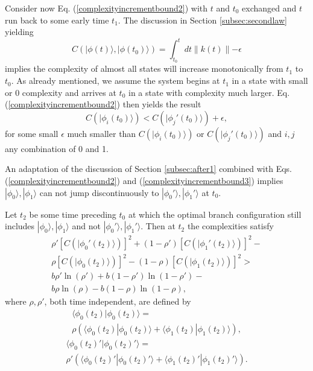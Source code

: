 \documentclass[twocolumn,amsmath,amssymb]{revtex4-1}
\begin{document}
Consider now Eq. (\ref{complexityincrementbound2}) with
$t$ and $t_0$ exchanged and $t$ run back to some early time
$t_1$.  The
discussion in Section \ref{subsec:secondlaw}
yielding
\begin{equation}
  \label{complexityincrement2x}
  C( |\phi(t) \rangle , |\phi(t_0) \rangle ) = \int_{t_0}^t dt \parallel k(t) \parallel - \epsilon
\end{equation}
implies the complexity of almost all states will
increase monotonically from $t_1$ to $t_0$.
As already mentioned, we assume the system
begins at $t_1$ in a state with small or 0 complexity
and arrives at $t_0$ in a state with complexity
much larger.  Eq. (\ref{complexityincrementbound2})
then yields the result
\begin{equation}
  \label{complexityincrementbound3}
  C(|\phi_i(t_0) \rangle ) < C(|\phi_j'(t_0) \rangle ) + \epsilon,
\end{equation}
for some small $\epsilon$ much smaller than
$C(|\phi_i(t_0) \rangle )$ or $C(|\phi_j'(t_0) \rangle )$
and $i, j$  any combination of 0 and 1.

An adaptation of the discussion of
Section \ref{subsec:after1} combined with
Eqs. (\ref{complexityincrementbound2}) and
(\ref{complexityincrementbound3})
implies $|\phi_0 \rangle , |\phi_1 \rangle $
can not jump discontinuously to
$|\phi_0' \rangle , |\phi_1' \rangle $ at $t_0$.

Let $t_2$ be some time preceding $t_0$ at which
the optimal branch configuration still includes 
$|\phi_0 \rangle , |\phi_1 \rangle $
and not
$|\phi_0' \rangle , |\phi_1' \rangle $.
Then at $t_2$
the complexities satisfy
\begin{multline}
  \label{splitcondition3}
  \rho' [C( |\phi_0'(t_2) \rangle )]^2 + ( 1 - \rho') [C( |\phi_1'(t_2) \rangle )]^2 - \\
  \rho [C( |\phi_0(t_2) \rangle )]^2 - ( 1 - \rho) [C( |\phi_1(t_2) \rangle )]^2 > \\
 b \rho' \ln( \rho') + b ( 1 - \rho') \ln( 1 - \rho') - \\
 b \rho \ln( \rho) - b ( 1 - \rho) \ln( 1 - \rho),
\end{multline}
where $\rho, \rho'$, both time independent, are defined by
\begin{multline}
    \label{rho2}
     \langle  \phi_0(t_2) | \phi_0(t_2) \rangle  = \\ \rho ( \langle  \phi_0(t_2) | \phi_0(t_2) \rangle  +  \langle \phi_1(t_2)|\phi_1(t_2) \rangle ),
\end{multline}
\begin{multline}
    \label{rho2prime}
     \langle  \phi_0(t_2)' | \phi_0(t_2)' \rangle  = \\ \rho' ( \langle  \phi_0(t_2)' | \phi_0(t_2)' \rangle  +  \langle \phi_1(t_2)'|\phi_1(t_2)' \rangle ).
\end{multline}
\end{document}
